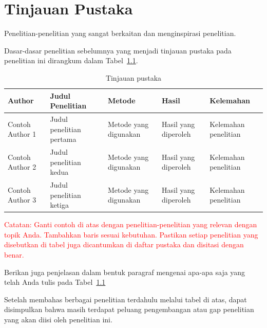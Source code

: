 \chapter{Tinjauan Pustaka}

Penelitian-penelitian yang sangat berkaitan dan menginspirasi penelitian. 

Dasar-dasar penelitian sebelumnya yang menjadi tinjauan pustaka pada penelitian ini dirangkum dalam Tabel~\ref{tab:tinjauan-pustaka}.

\begin{table}[h]
\centering
\caption{Tinjauan pustaka}
\label{tab:tinjauan-pustaka}
\begin{tabular}{|p{3cm}|p{3cm}|p{2.5cm}|p{2.5cm}|p{2.5cm}|}
\hline
\textbf{Author} & \textbf{Judul Penelitian} & \textbf{Metode} & \textbf{Hasil} & \textbf{Kelemahan} \\
\hline
Contoh Author 1 & Judul penelitian pertama & Metode yang digunakan & Hasil yang diperoleh & Kelemahan penelitian \\
\hline
Contoh Author 2 & Judul penelitian kedua & Metode yang digunakan & Hasil yang diperoleh & Kelemahan penelitian \\
\hline
Contoh Author 3 & Judul penelitian ketiga & Metode yang digunakan & Hasil yang diperoleh & Kelemahan penelitian \\
\hline
\end{tabular}
\end{table}

\textcolor{red}{Catatan: Ganti contoh di atas dengan penelitian-penelitian yang relevan dengan topik Anda. Tambahkan baris sesuai kebutuhan. Pastikan setiap penelitian yang disebutkan di tabel juga dicantumkan di daftar pustaka dan disitasi dengan benar.}

Berikan juga penjelasan dalam bentuk paragraf mengenai apa-apa saja yang telah Anda tulis pada Tabel~\ref{tab:tinjauan-pustaka}

Setelah membahas berbagai penelitian terdahulu melalui tabel di atas, dapat disimpulkan bahwa masih terdapat peluang pengembangan atau gap penelitian yang akan diisi oleh penelitian ini.
